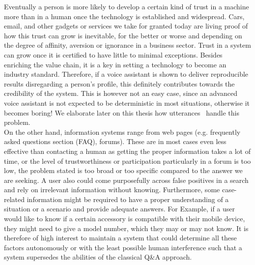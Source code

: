 Eventually a person is more likely to develop a certain kind of trust in a machine more than in a human once the technology is established and widespread.
Cars, email, and other gadgets or services we take for granted today are living proof of how this trust can grow is inevitable, for the better or worse and depending on the degree of affinity, aversion or ignorance in a business sector.
Trust in a system can grow once it is certified to have little to minimal exceptions. Besides enriching the value chain, it is a key in setting a technology to become an industry standard.
Therefore, if a voice assistant is shown to deliver reproducible results disregarding a person's profile, this definitely contributes towards the credibility of the system.
This is however not an easy case, since an advanced voice assistant is not expected to be deterministic in most situations, otherwise it becomes boring! We elaborate later on this thesis how utterances~\tocite{} handle this problem.\\


On the other hand, information systems range from web pages (e.g. frequently asked questions section (FAQ), forums). These are in most cases even less effective than contacting a human as getting the proper information takes a lot of time, or the level of trustworthiness or participation particularly in a forum is too low, the problem stated is too broad or too specific compared to the answer we are seeking. A user also could come purposefully across false positives in a search and rely on irrelevant information without knowing.
Furthermore, some case-related information might be required to have a proper understanding of a situation or a scenario and provide adequate answers. For Example, if a user would like to know if a certain accessory is compatible with their mobile device, they might need to give a model number, which they may or may not know.
It is therefore of high interest to maintain a system that could determine all these factors autonomously or with the least possible human interference such that a system supersedes the abilities of the classical Q\&A approach.\\

